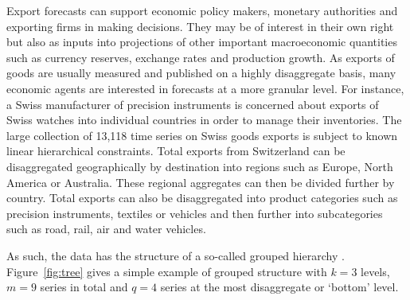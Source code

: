 \documentclass[a4paper,fleqn,11pt]{article}
\begin{document}
Export forecasts can support economic policy makers, monetary authorities and exporting firms in making decisions.  They may be of interest in their own right but also as inputs into projections of other important macroeconomic quantities such as currency reserves, exchange rates and production growth. As exports of goods are usually measured and published on a highly disaggregate basis, many economic agents are interested in forecasts at a more granular level. For instance, a Swiss manufacturer of precision instruments is concerned about exports of Swiss watches into individual countries in order to manage their inventories. The large collection of 13,118 time series on Swiss goods exports is subject to known linear hierarchical constraints. Total exports from Switzerland can be disaggregated geographically by destination into regions such as Europe, North America or Australia. These regional aggregates can then be divided further by country. Total exports can also be disaggregated into product categories such as precision instruments, textiles or vehicles and then further into subcategories such as road, rail, air and water vehicles.

As such, the data has the structure of a so-called grouped hierarchy \citep[see][and references therein]{Hyndman2018}. Figure~\ref{fig:tree} gives a simple example of grouped structure with $k = 3$ levels, $m = 9$ series in total and $q = 4$ series at the most disaggregate or `bottom' level.
\end{document}
